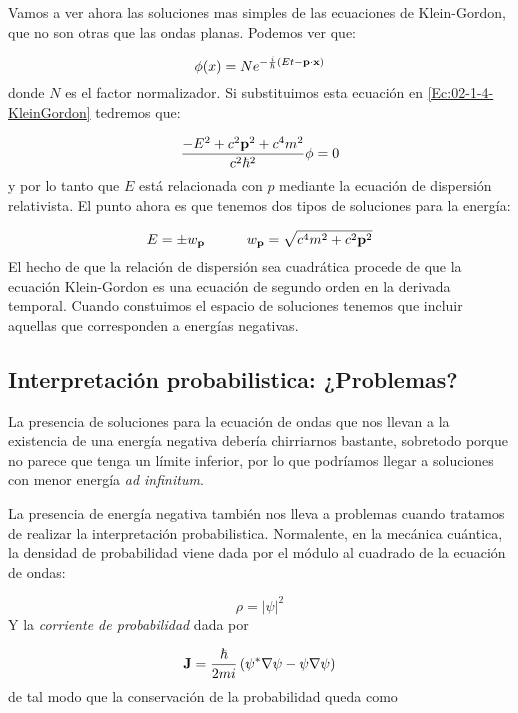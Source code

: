 Vamos a ver ahora las soluciones mas simples de las ecuaciones de Klein-Gordon, que no son otras que las ondas planas. Podemos ver que:

\begin{equation}
    \phi (x) = N e^{-\frac{i}{\hbar} (Et - \mathbf{p} \cdot \mathbf{x})}
\end{equation}
donde $N$ es el factor normalizador. Si substituimos esta ecuación en \ref{Ec:02-1-4-KleinGordon} tedremos que:

\begin{equation}
    \frac{-E^2 + c^2 \mathbf{p}^2 + c^4 m^2}{c^2 \hbar^2}\phi = 0
\end{equation}
y por lo tanto que $E$ está relacionada con $p$ mediante la ecuación de dispersión relativista. El punto ahora es que tenemos dos tipos de soluciones para la energía:

\begin{equation}
    E = \pm w_{\mathbf{p}} \quad \quad \quad w_{\mathbf{p}} = \sqrt{c^4 m^2 + c^2\mathbf{p}^2}
\end{equation}
El hecho de que la relación de dispersión sea cuadrática procede de que la ecuación Klein-Gordon es una ecuación de segundo orden en la derivada temporal. Cuando constuimos el espacio de soluciones tenemos que incluir aquellas que corresponden a energías negativas.  \\

\subsection{Interpretación probabilistica: ¿Problemas?}

La presencia de soluciones para la ecuación de ondas que nos llevan a la existencia de una energía negativa debería chirriarnos bastante, sobretodo porque no parece que tenga un límite inferior, por lo que podríamos llegar a soluciones con menor energía {\it ad infinitum}.

La presencia de energía negativa también nos lleva a problemas cuando tratamos de realizar la interpretación probabilistica. Normalente, en la mecánica cuántica, la densidad de probabilidad viene dada por el módulo al cuadrado de la ecuación de ondas:

\begin{equation}
    \rho = |\psi|^2
\end{equation}
Y la {\it corriente de probabilidad} dada por 

\begin{equation}
    \mathbf{J} = \frac{\hbar}{2mi} \left( \psi^* \nabla \psi - \psi \nabla \psi \right)
\end{equation}
de tal modo que la conservación de la probabilidad queda como

